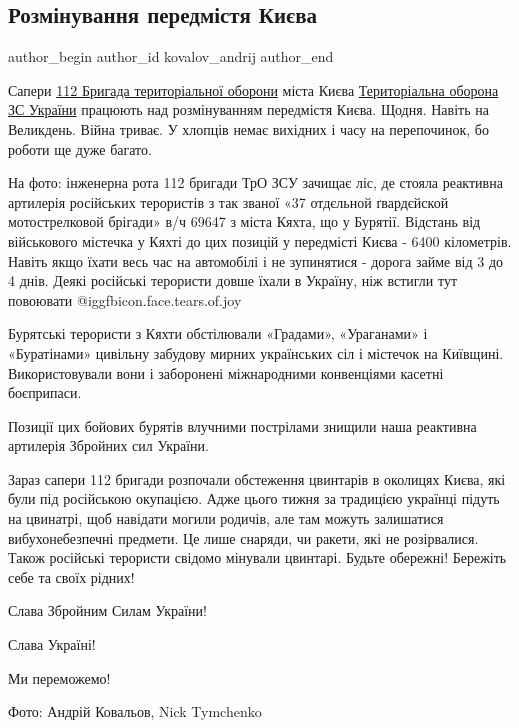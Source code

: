  
 
 
 
 
 
\subsection{Розмінування передмістя Києва}
\label{sec:25_04_2022.fb.kovalov_andrij.1.razminirovanie_predmestij_kieva}
 
\ifcmt
 author_begin
   author_id kovalov_andrij
 author_end
\fi

Сапери \href{https://www.facebook.com/112btro}{112 Бригада територіальної
оборони} міста Києва
\href{https://www.facebook.com/TerritorialDefenseForces}{Територіальна оборона
ЗС України} працюють над розмінуванням передмістя Києва. Щодня. Навіть на
Великдень. Війна триває. У хлопців немає вихідних і часу на перепочинок, бо
роботи ще дуже багато.

На фото: інженерна рота 112 бригади ТрО ЗСУ зачищає ліс, де стояла реактивна
артилерія російських терористів з так званої «37 отдєльной ґвардєйской
мотострелковой брігади» в/ч 69647 з міста Кяхта, що у Бурятії. Відстань від
військового містечка у Кяхті до цих позицій у передмісті Києва - 6400
кілометрів. Навіть якщо їхати весь час на автомобілі і не зупинятися - дорога
займе від 3 до 4 днів. Деякі російські терористи довше їхали в Україну, ніж
встигли тут повоювати  @igg{fbicon.face.tears.of.joy} 

Бурятські терористи з Кяхти обстілювали «Градами», «Ураганами» і «Буратінами»
цивільну забудову мирних українських сіл і містечок на Київщині.
Використовували вони і заборонені міжнародними конвенціями касетні боєприпаси. 

Позиції цих бойових бурятів влучними пострілами знищили наша реактивна
артилерія Збройних сил України. 

Зараз сапери 112 бригади розпочали обстеження цвинтарів в околицях Києва, які
були під російською окупацією. Адже цього тижня за традицією українці підуть на
цвинатрі, щоб навідати могили родичів, але там можуть залишатися
вибухонебезпечні предмети. Це лише снаряди, чи ракети, які не розірвалися.
Також російські терористи свідомо мінували цвинтарі. Будьте обережні! Бережіть
себе та своїх рідних!

Слава Збройним Силам України! 

Слава Україні! 

Ми переможемо! 

Фото: Андрій Ковальов, Nick Tymchenko
